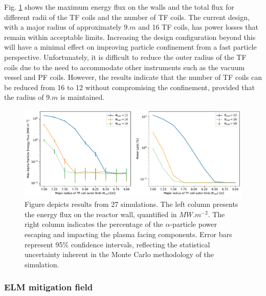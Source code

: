 \documentclass[10pt, a4paper, twoside]{article}
\begin{document}
Fig. \ref{fig:max_and_total_flux_vs_rcoil_and_ncoil} shows the maximum energy flux on the walls and the total flux for different radii of the TF coils and the number of TF coils. The current design, with a major radius of approximately $\si{9.m}$ and 16 TF coils, has power losses that remain within acceptable limits. Increasing the design configuration beyond this will have a minimal effect on improving particle confinement from a fast particle perspective. 
Unfortunately, it is difficult to reduce the outer radius of the TF coils due to the need to accommodate other instruments such as the vacuum vessel and PF coils. However, the results indicate that the number of TF coils can be reduced from 16 to 12 without compromising the confinement, provided that the radius of $9\si{.m}$ is maintained.

\begin{figure}[!htb]
    \centering
    \includegraphics[width=0.99\linewidth]{Figures/max_and_total_flux_vs_rcoil_and_ncoil.pdf}
    \caption{Figure depicts results from 27 simulations. The left column presents the energy flux on the reactor wall, quantified in $\si{MW.m^{-2}}$. The right column indicates the percentage of the $\alpha$-particle power escaping and impacting the plasma facing components. Error bars represent 95\% confidence intervals, reflecting the statistical uncertainty inherent in the Monte Carlo methodology of the simulation.}
    \label{fig:max_and_total_flux_vs_rcoil_and_ncoil}
\end{figure}

\subsubsection{ELM mitigation field}
\label{sec:elm_mitigation_field}
\end{document}

